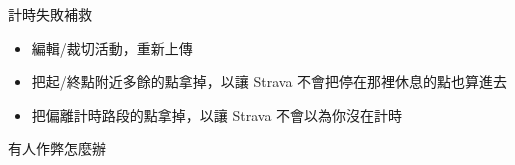 \begin{frame}{計時失敗補救}
\begin{itemize}
\item 編輯/裁切活動，重新上傳\pause
\item 把起/終點附近多餘的點拿掉，以讓 Strava 不會把停在那裡休息的點也算進去\pause
\item 把偏離計時路段的點拿掉，以讓 Strava 不會以為你沒在計時
\end{itemize}
\end{frame}

\begin{frame}{有人作弊怎麼辦}
\begin{itemize}
\begin{multicols}{2}
\end{multicols}
\end{itemize}
\end{frame}
